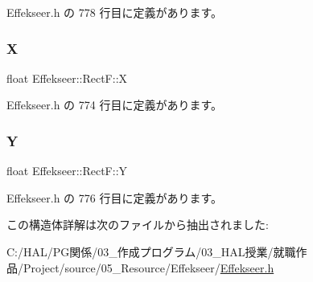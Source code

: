  Effekseer.\+h の 778 行目に定義があります。

\mbox{\label{struct_effekseer_1_1_rect_f_ae059c8a9c7b7df7675aa77add61de01f}} 
\subsubsection{\texorpdfstring{X}{X}}
{\footnotesize\ttfamily float Effekseer\+::\+Rect\+F\+::X}



 Effekseer.\+h の 774 行目に定義があります。

\mbox{\label{struct_effekseer_1_1_rect_f_ac019b5783fec33a61954817f04ead8f0}} 
\subsubsection{\texorpdfstring{Y}{Y}}
{\footnotesize\ttfamily float Effekseer\+::\+Rect\+F\+::Y}



 Effekseer.\+h の 776 行目に定義があります。



この構造体詳解は次のファイルから抽出されました\+:\begin{DoxyCompactItemize}
\item 
C\+:/\+H\+A\+L/\+P\+G関係/03\+\_\+作成プログラム/03\+\_\+\+H\+A\+L授業/就職作品/\+Project/source/05\+\_\+\+Resource/\+Effekseer/\mbox{\hyperlink{_effekseer_8h}{Effekseer.\+h}}\end{DoxyCompactItemize}
